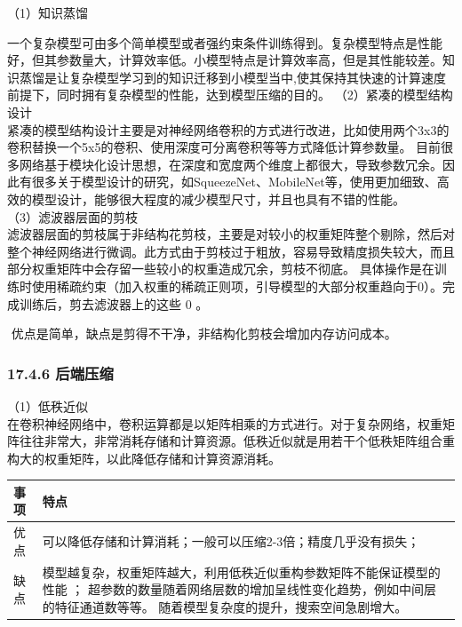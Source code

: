 （1）知识蒸馏

​
一个复杂模型可由多个简单模型或者强约束条件训练得到。复杂模型特点是性能好，但其参数量大，计算效率低。小模型特点是计算效率高，但是其性能较差。知识蒸馏是让复杂模型学习到的知识迁移到小模型当中,使其保持其快速的计算速度前提下，同时拥有复杂模型的性能，达到模型压缩的目的。
（2）紧凑的模型结构设计\\
​
紧凑的模型结构设计主要是对神经网络卷积的方式进行改进，比如使用两个3x3的卷积替换一个5x5的卷积、使用深度可分离卷积等等方式降低计算参数量。
目前很多网络基于模块化设计思想，在深度和宽度两个维度上都很大，导致参数冗余。因此有很多关于模型设计的研究，如SqueezeNet、MobileNet等，使用更加细致、高效的模型设计，能够很大程度的减少模型尺寸，并且也具有不错的性能。\\
（3）滤波器层面的剪枝\\
​
滤波器层面的剪枝属于非结构花剪枝，主要是对较小的权重矩阵整个剔除，然后对整个神经网络进行微调。此方式由于剪枝过于粗放，容易导致精度损失较大，而且部分权重矩阵中会存留一些较小的权重造成冗余，剪枝不彻底。
具体操作是在训练时使用稀疏约束（加入权重的稀疏正则项，引导模型的大部分权重趋向于0）。完成训练后，剪去滤波器上的这些
0 。

​ 优点是简单，缺点是剪得不干净，非结构化剪枝会增加内存访问成本。

\subsubsection{17.4.6 后端压缩}\label{ux540eux7aefux538bux7f29}

（1）低秩近似\\
​
在卷积神经网络中，卷积运算都是以矩阵相乘的方式进行。对于复杂网络，权重矩阵往往非常大，非常消耗存储和计算资源。低秩近似就是用若干个低秩矩阵组合重构大的权重矩阵，以此降低存储和计算资源消耗。

\begin{longtable}[]{ ll }
\toprule
\begin{minipage}[b]{0.07\columnwidth}\raggedright\strut
事项\strut
\end{minipage} & \begin{minipage}[b]{0.80\columnwidth}\raggedright\strut
特点\strut
\end{minipage}\tabularnewline
\midrule
\endhead
\begin{minipage}[t]{0.07\columnwidth}\raggedright\strut
优点\strut
\end{minipage} & \begin{minipage}[t]{0.80\columnwidth}\raggedright\strut
可以降低存储和计算消耗；一般可以压缩2-3倍；精度几乎没有损失；\strut
\end{minipage}\tabularnewline
\begin{minipage}[t]{0.07\columnwidth}\raggedright\strut
缺点\strut
\end{minipage} & \begin{minipage}[t]{0.80\columnwidth}\raggedright\strut
模型越复杂，权重矩阵越大，利用低秩近似重构参数矩阵不能保证模型的性能 ；
超参数的数量随着网络层数的增加呈线性变化趋势，例如中间层的特征通道数等等。
随着模型复杂度的提升，搜索空间急剧增大。\strut
\end{minipage}\tabularnewline
\bottomrule
\end{longtable}

